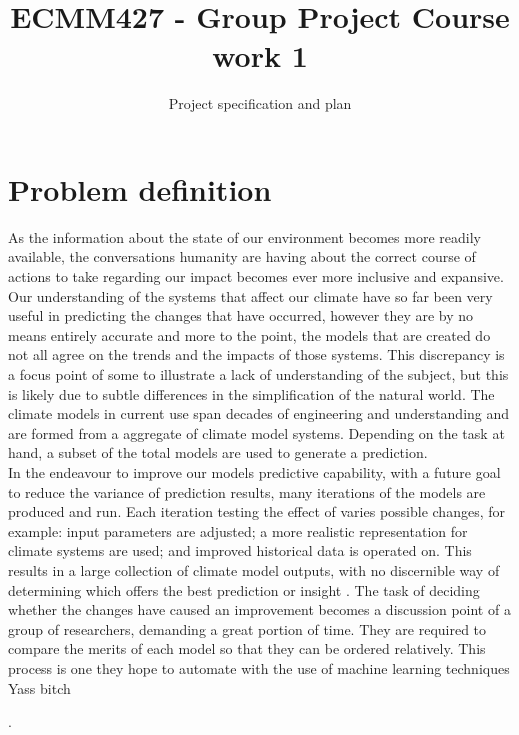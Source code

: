 \documentclass[11pt]{article} %
\title{ECMM427 - Group Project Course work 1}
\author{Project specification and plan}
\numberwithin{equation}{section}
\begin{document}
\pagestyle{empty}
\tableofcontents
\clearpage
\pagestyle{fancy}
\setcounter{page}{1}
\maketitle

\section{Problem definition}

As the information about the state of our environment becomes more readily available, the conversations humanity are having about the correct course of actions to take regarding our impact becomes ever more inclusive and expansive. Our understanding of the systems that affect our climate have so far been very useful in predicting the changes that have occurred, however they are by no means entirely accurate and more to the point, the models that are created do not all agree on the trends and the impacts of those systems. This discrepancy is a focus point of some to illustrate a lack of understanding of the subject, but this is likely due to subtle differences in the simplification of the natural world. The climate models in current use span decades of engineering and understanding and are formed from a aggregate of climate model systems. Depending on the task at hand, a subset of the total models are used to generate a prediction.\\

In the endeavour to improve our models predictive capability, with a future goal to reduce the variance of prediction results, many iterations of the models are produced and run. Each iteration testing the effect of varies possible changes, for example: input parameters are adjusted; a more realistic representation for climate systems are used; and improved historical data is operated on. This results in a large collection of climate model outputs, with no discernible way of determining which offers the best prediction or insight . The task of deciding whether the changes have caused an improvement becomes a discussion point of a group of researchers, demanding a great portion of time. They are required to compare the merits of each model so that they can be ordered relatively. This process is one they hope to automate with the use of machine learning techniques\\


Yass bitch

.\\
\end{document}
